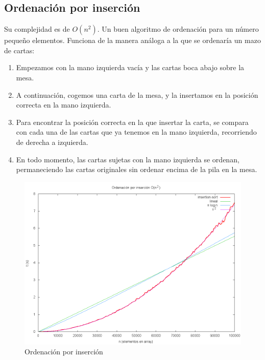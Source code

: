 \subsection{Ordenación por inserción}
Su complejidad es de $O(n^2)$. Un buen algoritmo de ordenación para un número pequeño elementos. Funciona de la manera análoga a la que se ordenaría un mazo de cartas:\cite{CORMEN}
\begin{enumerate}
	\item Empezamos con la mano izquierda vacía y las cartas boca abajo sobre la mesa.
	\item A continuación, cogemos una carta de la mesa, y la insertamos en la posición correcta 			en la mano izquierda.
	\item Para encontrar la posición correcta en la que insertar la carta, se compara con cada 			una de las cartas que ya tenemos en la mano izquierda, recorriendo de derecha a 					izquierda.
\item En todo momento, las cartas sujetas con la mano izquierda se ordenan, permaneciendo las 			cartas originales sin ordenar encima de la pila en la mesa.
\end{enumerate}

	\begin{figure}[H]
  		\centering
   		 \includegraphics[width=1.0\textwidth]{insertion-sort.png}
  		\caption{Ordenación por inserción}
 			 \label{fig:insertion}
		\end{figure}

\newpage
